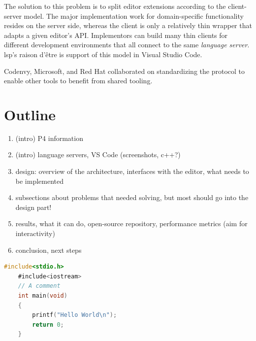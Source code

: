The solution to this problem is to split editor extensions according to the
client-server model. The major implementation work for domain-specific
functionality resides on the server side, whereas the client is only a
relatively thin wrapper that adapts a given editor's API. Implementors can build
many thin clients for different development environments that all connect to the
same \emph{language server}. \acrshort{lsp}'s raison d'être is support of this
model in Visual Studio Code.

Coden\-vy, Microsoft, and Red Hat collaborated on standardizing the protocol to
enable other tools to benefit from shared
tooling\cite{sdtimesCodenvyMicrosoft,infoworldMicrosoftbackedLanguage}.

\section{Outline}

\begin{enumerate}
	\item (intro) P4 information
	\item (intro) language servers, VS Code (screenshots, c++?)
	\item design: overview of the architecture, interfaces with the editor, what
		needs to be implemented
	\item subsections about problems that needed solving, but most should go into
		the design part!
	\item results, what it can do, open-source repository, performance metrics
		(aim for interactivity)
	\item conclusion, next steps
\end{enumerate}




\begin{lstlisting}[caption={~Zbytečný kód},label=list:8-6,captionpos=t,float,abovecaptionskip=-\medskipamount,belowcaptionskip=\medskipamount,language=C]
	#include<stdio.h>
	#include<iostream>
	// A comment
	int main(void)
	{
		printf("Hello World\n");
		return 0;
	}
\end{lstlisting}


